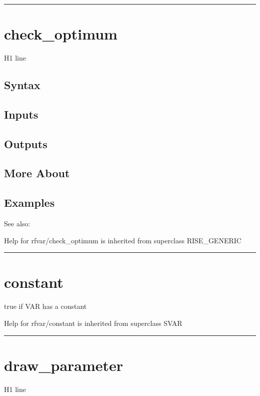 \documentclass[letterpaper,10pt,english]{sphinxmanual}
\begin{document}
\bigskip\hrule{}\bigskip



\section{check\_optimum}
\label{classes/models/@rfvar/rfvar:check-optimum}\label{classes/models/@rfvar/rfvar:id2}
H1 line


\subsection{Syntax}
\label{classes/models/@rfvar/rfvar:id3}

\subsection{Inputs}
\label{classes/models/@rfvar/rfvar:id4}

\subsection{Outputs}
\label{classes/models/@rfvar/rfvar:id5}

\subsection{More About}
\label{classes/models/@rfvar/rfvar:id6}

\subsection{Examples}
\label{classes/models/@rfvar/rfvar:id7}
See also:

Help for rfvar/check\_optimum is inherited from superclass RISE\_GENERIC


\bigskip\hrule{}\bigskip



\section{constant}
\label{classes/models/@rfvar/rfvar:constant}\label{classes/models/@rfvar/rfvar:id8}
true if VAR has a constant

Help for rfvar/constant is inherited from superclass SVAR


\bigskip\hrule{}\bigskip



\section{draw\_parameter}
\label{classes/models/@rfvar/rfvar:draw-parameter}\label{classes/models/@rfvar/rfvar:id9}
H1 line
\end{document}
